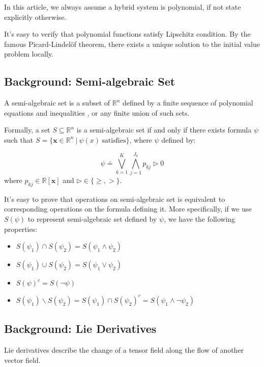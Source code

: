 \documentclass{jssc}
\begin{document}
In this article, we always assume a hybrid system is polynomial, if not state explicitly otherwise.

It's easy to verify that polynomial functions satisfy Lipschitz condition. By the famous Picard-Lindel\"{o}f theorem, there exists a unique solution to the initial value problem locally.

\subsection{Background: Semi-algebraic Set} 
\begin{definition}
\label{def:semialgebra}
A semi-algebraic set is a subset of $\mathbb{R}^n$ defined by a finite sequence of polynomial equations and inequalities , or any finite union of such sets.

Formally, a set $S \subseteq \mathbb{R}^n$ is a semi-algebraic set if and only if there exists formula $\psi$ such that $S = \{\boldsymbol{x} \in \mathbb{R}^n\ |\ \psi(x)\ \text{satisfies} \}$,  where $\psi$ defined by: 

\begin{displaymath}
	\psi \doteq \bigvee_{k=1}^{K} \bigwedge_{j=1}^{J_k}p_{kj} \rhd 0
\end{displaymath}
where $p_{kj} \in \mathbb{R}[\boldsymbol{x}]$ and $\rhd \in \{\geq, >\}$.
\end{definition}

It's easy to prove that operations on semi-algebraic set is equivalent to corresponding operations on the formula defining it. More specifically, if we use $S(\psi)$ to represent semi-algebraic set defined by $\psi$, we have the following properties: 
\begin{itemize}
	\item $S(\psi_1) \cap S(\psi_2) = S(\psi_1 \wedge \psi_2)$
	\item $S(\psi_1) \cup S(\psi_2) = S(\psi_1 \vee \psi_2)$
	\item $S(\psi)^c = S(\neg \psi)$
	\item $S(\psi_1) \backslash S(\psi_2) = S(\psi_1) \cap S(\psi_2)^c = S(\psi_1 \wedge \neg \psi_2)$
\end{itemize}

\subsection{Background: Lie Derivatives}
Lie derivatives describe the change of a tensor field along the flow of another vector field. 
\end{document}
